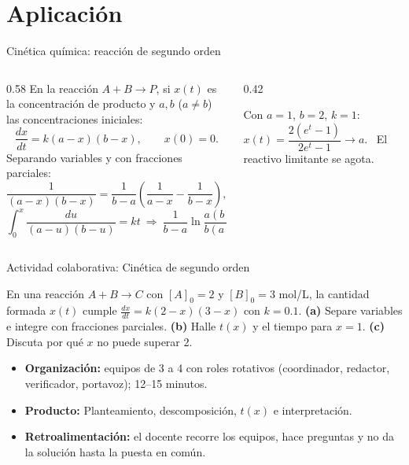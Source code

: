 \documentclass[10pt,aspectratio=169]{beamer}
\begin{document}
\section{Aplicación}

\begin{frame}{Cinética química: reacción de segundo orden}
  \begin{columns}
    \begin{column}{0.58\textwidth}
      En la reacción $A+B\to P$, si $x(t)$ es la concentración de producto y $a,b$ ($a\neq b$) las concentraciones iniciales:
      \[ \frac{dx}{dt}=k(a-x)(b-x),\qquad x(0)=0. \]
      Separando variables y con fracciones parciales:
      \[ \frac{1}{(a-x)(b-x)}=\frac{1}{b-a}\left(\frac{1}{a-x}-\frac{1}{b-x}\right), \]
      \[ \int_0^x\frac{du}{(a-u)(b-u)}=kt\ \Rightarrow\ \frac{1}{b-a}\ln\frac{a(b-x)}{b(a-x)}=kt. \]
    \end{column}
    \begin{column}{0.42\textwidth}
      \centering

      \small Con $a=1$, $b=2$, $k=1$: \ $x(t)=\dfrac{2(e^{t}-1)}{2e^{t}-1}\to a$. \ El reactivo limitante se agota.
    \end{column}
  \end{columns}
\end{frame}

\begin{frame}{Actividad colaborativa: Cinética de segundo orden}
  \small
  \begin{activa}
    En una reacción $A+B\to C$ con $[A]_0=2$ y $[B]_0=3$ mol/L, la cantidad formada $x(t)$ cumple $\frac{dx}{dt}=k(2-x)(3-x)$ con $k=0.1$. \textbf{(a)} Separe variables e integre con fracciones parciales. \textbf{(b)} Halle $t(x)$ y el tiempo para $x=1$. \textbf{(c)} Discuta por qué $x$ no puede superar 2.
  \end{activa}
  \begin{itemize}
    \item \textbf{Organización:} equipos de 3 a 4 con roles rotativos (coordinador, redactor, verificador, portavoz); 12--15 minutos.
    \item \textbf{Producto:} Planteamiento, descomposición, $t(x)$ e interpretación.
    \item \textbf{Retroalimentación:} el docente recorre los equipos, hace preguntas y no da la solución hasta la puesta en común.
  \end{itemize}
\end{frame}
\end{document}
